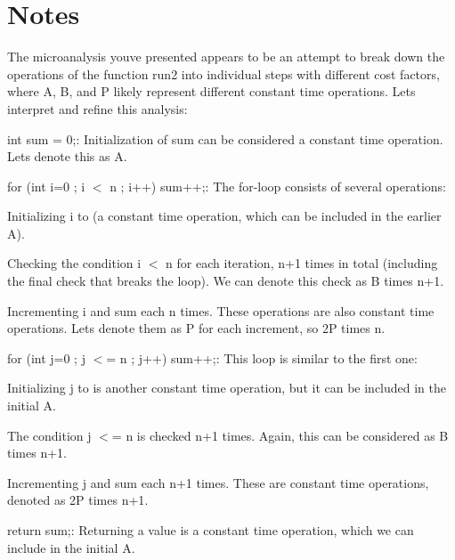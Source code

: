 \chapter{Notes}
\hypertarget{md__notes}{}\label{md__notes}
The microanalysis you\textquotesingle{}ve presented appears to be an attempt to break down the operations of the function {\ttfamily run2} into individual steps with different cost factors, where {\ttfamily A}, {\ttfamily B}, and {\ttfamily P} likely represent different constant time operations. Let\textquotesingle{}s interpret and refine this analysis\+:


\begin{DoxyEnumerate}
\item {\ttfamily int sum = 0;}\+: Initialization of {\ttfamily sum} can be considered a constant time operation. Let\textquotesingle{}s denote this as {\ttfamily A}.
\item {\ttfamily for (int i=0 ; i \texorpdfstring{$<$}{<} n ; i++) sum++;}\+: The for-\/loop consists of several operations\+:
\begin{DoxyItemize}
\item Initializing {\ttfamily i} to {} (a constant time operation, which can be included in the earlier {\ttfamily A}).
\item Checking the condition {\ttfamily i \texorpdfstring{$<$}{<} n} for each iteration, {\ttfamily n+1} times in total (including the final check that breaks the loop). We can denote this check as {\ttfamily B} times {\ttfamily n+1}.
\item Incrementing {\ttfamily i} and {\ttfamily sum} each {\ttfamily n} times. These operations are also constant time operations. Let\textquotesingle{}s denote them as {\ttfamily P} for each increment, so {\ttfamily 2P} times {\ttfamily n}.
\end{DoxyItemize}
\item {\ttfamily for (int j=0 ; j \texorpdfstring{$<$}{<}= n ; j++) sum++;}\+: This loop is similar to the first one\+:
\begin{DoxyItemize}
\item Initializing {\ttfamily j} to {} is another constant time operation, but it can be included in the initial {\ttfamily A}.
\item The condition {\ttfamily j \texorpdfstring{$<$}{<}= n} is checked {\ttfamily n+1} times. Again, this can be considered as {\ttfamily B} times {\ttfamily n+1}.
\item Incrementing {\ttfamily j} and {\ttfamily sum} each {\ttfamily n+1} times. These are constant time operations, denoted as {\ttfamily 2P} times {\ttfamily n+1}.
\end{DoxyItemize}
\item {\ttfamily return sum;}\+: Returning a value is a constant time operation, which we can include in the initial {\ttfamily A}.
\end{DoxyEnumerate}

